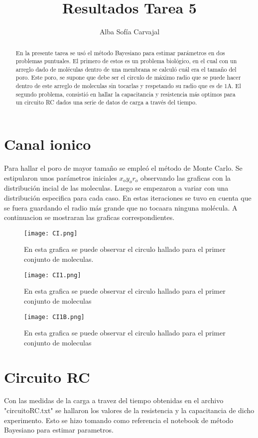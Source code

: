 \documentclass[a4paper]{article}
\title{Resultados Tarea 5}
\author{Alba Sofía Carvajal}
\begin{document}
\maketitle

\begin{abstract}
En la presente tarea se usó el método Bayesiano para estimar parámetros en dos problemas puntuales. El primero de estos es un problema biológico, en el cual con un arreglo dado de moléculas dentro de una membrana se calculó cuál era el tamaño del poro. Este poro, se supone que debe ser el circulo de máximo radio que se puede hacer dentro de este arreglo de moleculas sin tocarlas y respetando su radio que es de 1A. El segundo problema, consistió en hallar la capacitancia y resistencia más optimos para un circuito RC dados una serie de datos de carga a través del tiempo.
\end{abstract}

\section{Canal ionico}
Para hallar el poro de mayor tamaño se empleó el método de Monte Carlo. Se estipularon unos parámetros iniciales $x_o y_o r_o$ observando las graficas con la distribución incial de las moleculas. Luego se empezaron a variar con una distribución especifica para cada caso. En estas iteraciones se tuvo en cuenta que se fuera guardando el radio más grande que no tocaara ninguna molécula. A continuacion se mostraran las graficas correspondientes.

\begin{figure}
\centering
\texttt{[image: CI.png]}
\caption{\label{fig:CI}En esta grafica se puede observar el circulo hallado para el primer conjunto de moleculas.}
\end{figure}

\begin{figure}
\centering
\texttt{[image: CI1.png]}
\caption{\label{fig:CI1}En esta grafica se puede observar el circulo hallado para el primer conjunto de moleculas}
\end{figure}

\begin{figure}
\centering
\texttt{[image: CI1B.png]}
\caption{\label{fig:CI1B}En esta grafica se puede observar el circulo hallado para el primer conjunto de moleculas}
\end{figure}

\section{Circuito RC}
Con las medidas de la carga a travez del tiempo obtenidas en el archivo "circuitoRC.txt" se hallaron los valores de la resistencia y la capacitancia de dicho experimento. Esto se hizo tomando como referencia el notebook de método Bayesiano para estimar parametros.
\end{document}
